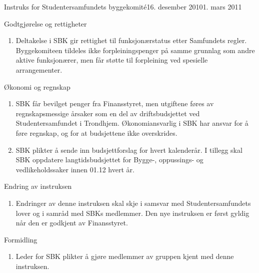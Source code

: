 \begin{instruks}{Instruks for Studentersamfundets byggekomité}{16. desember 2010}{1. mars 2011}
    \begin{instruksledd}{Godtgjørelse og rettigheter}
        \begin{enumerate}
		\item Deltakelse i SBK gir rettighet til funksjonærstatus etter Samfundets
		regler. Byggekomiteen tildeles ikke forpleiningspenger på samme grunnlag som andre aktive funksjonærer,
		men får støtte til forpleining ved spesielle arrangementer.
	\end{enumerate}
    \end{instruksledd}

    \begin{instruksledd}{Økonomi og regnskap}
        \begin{enumerate}
            \item SBK får bevilget penger fra Finansstyret, men utgiftene føres av
                regnskapsmessige årsaker som en del av
                driftsbudsjettet ved Studentersamfundet i Trondhjem. Økonomiansvarlig i SBK har
                ansvar for å føre
                regnskap, og for at budsjettene ikke overskrides.
            \item SBK plikter å sende inn budsjettforslag for hvert kalenderår. I tillegg skal
                SBK oppdatere langtidsbudsjettet
                for Bygge-, oppussings- og vedlikeholdssaker innen 01.12 hvert år.
        \end{enumerate}
    \end{instruksledd}

    \begin{instruksledd}{Endring av instruksen}
        \begin{enumerate}
            \item Endringer av denne instruksen skal skje i samsvar med Studentersamfundets lover
                og i samråd med SBKs
                medlemmer. Den nye instruksen er først gyldig når den er godkjent av Finansstyret.
        \end{enumerate}
    \end{instruksledd}

    \begin{instruksledd}{Formidling}
        \begin{enumerate}
            \item Leder for SBK plikter å gjøre medlemmer av gruppen kjent med denne
                instruksen.
        \end{enumerate}
    \end{instruksledd}


\end{instruks}


